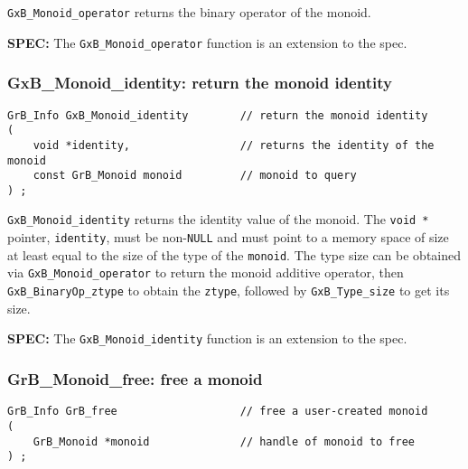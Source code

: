 \documentclass[12pt]{article}
\begin{document}
\verb'GxB_Monoid_operator' returns the binary operator of the monoid.

\begin{spec}
{\bf SPEC:} The \verb'GxB_Monoid_operator' function is an extension to the spec.
\end{spec}

\newpage
\subsubsection{{\sf GxB\_Monoid\_identity:} return the monoid identity}

\begin{mdframed}[userdefinedwidth=6in]
{\footnotesize
\begin{verbatim}
GrB_Info GxB_Monoid_identity        // return the monoid identity
(
    void *identity,                 // returns the identity of the monoid
    const GrB_Monoid monoid         // monoid to query
) ;
\end{verbatim}
} \end{mdframed}

\verb'GxB_Monoid_identity' returns the identity value of the monoid.  The
\verb'void *' pointer, \verb'identity', must be non-\verb'NULL' and must point
to a memory space of size at least equal to the size of the type of the
\verb'monoid'.  The type size can be obtained via \verb'GxB_Monoid_operator' to
return the monoid additive operator, then \verb'GxB_BinaryOp_ztype' to obtain
the \verb'ztype', followed by \verb'GxB_Type_size' to get its size.

\begin{spec}
{\bf SPEC:} The \verb'GxB_Monoid_identity' function is an extension to the spec.
\end{spec}

\subsubsection{{\sf GrB\_Monoid\_free:} free a monoid}
\label{monoid_free}

\begin{mdframed}[userdefinedwidth=6in]
{\footnotesize
\begin{verbatim}
GrB_Info GrB_free                   // free a user-created monoid
(
    GrB_Monoid *monoid              // handle of monoid to free
) ;
\end{verbatim}
} \end{mdframed}
\end{document}
